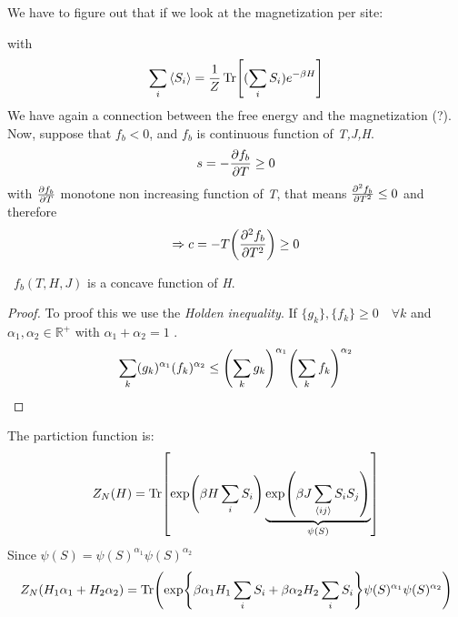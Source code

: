 \documentclass[../main/main.tex]{subfiles}
\begin{document}
We have to figure out that if we look at the magnetization per site:

with
\begin{equation}
  \sum_i \expval{S_i} = \frac{1}{Z} \Tr[(\sum_{i}^{} S_i  )e^{-\beta H} ]
\end{equation}
We have again a connection between the free energy and the magnetization (?).
Now, suppose that \( f_b < 0 \), and \( f_b \) is continuous function of \emph{T,J,H}.
\begin{equation}
  s = - \pdv{f_b}{T} \ge 0
\end{equation}
with \( \pdv{f_b}{T} \) monotone non increasing function of \emph{T}, that means \( \pdv[2]{f_b}{T} \le 0 \) and therefore
\begin{equation}
  \Rightarrow c = - T \qty(\pdv[2]{f_b}{T}) \ge 0
\end{equation}
\begin{theorem}[] \
\( f_b (T,H,J) \) is a concave function of \emph{H}.
\end{theorem}
\begin{proof}
To proof this we use the \emph{Holden inequality}. If \( \{g_k\},\{f_k\} \ge 0 \quad \forall k\)  and \( \alpha _1, \alpha _2 \in \mathbb{R}^+ \) with \( \alpha _1 + \alpha _2 = 1 \) .
\begin{equation}
  \sum_{k}^{} (g_k)^{\alpha _1} (f_k)^{\alpha _2} \le \qty(\sum_{k}^{} g_k  )^{\alpha _1} \qty(\sum_{k}^{} f_k  )^{\alpha _2}
\end{equation}

\end{proof}
The partiction function is:
\begin{equation}
  Z_N (H) = \Tr[\exp (\beta H \sum_{i}^{} S_i ) \underbrace{\exp (\beta J \sum_{\expval{ij} }^{} S_i S_j ) }_{\psi (S)}  ]
\end{equation}
Since \( \psi (S) = \psi (S)^{\alpha _1} \psi (S)^{\alpha _2} \)
\begin{equation}
  Z_N (H_1 \alpha _1 + H_2 \alpha _2) = \Tr(\exp {\beta \alpha _1 H_1 \sum_{i}^{} S_i + \beta \alpha _2 H_2 \sum_{i}^{} S_i} \psi (S)^{\alpha _1} \psi (S)^{\alpha _2})
\end{equation}
\end{document}
